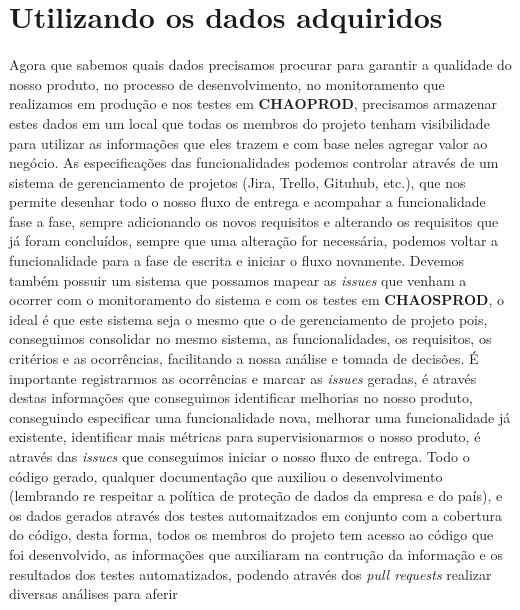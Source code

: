       \section{Utilizando os dados adquiridos}
        Agora que sabemos quais dados precisamos procurar para garantir a qualidade
        do nosso produto, no processo de desenvolvimento, no monitoramento que
        realizamos em produção e nos testes em \textbf{CHAOPROD}, precisamos
        armazenar estes dados em um local que todas os membros do projeto tenham
        visibilidade para utilizar as informações que eles trazem e com base neles
        agregar valor ao negócio. As especificações das funcionalidades podemos
        controlar através de um sistema de gerenciamento de projetos (Jira, Trello,
        Gituhub, etc.), que nos permite desenhar todo o nosso fluxo de entrega e
        acompahar a funcionalidade fase a fase, sempre adicionando os novos requisitos
        e alterando os requisitos que já foram concluídos, sempre que uma alteração
        for necessária, podemos voltar a funcionalidade para a fase de escrita e
        iniciar o fluxo novamente. Devemos também possuir um sistema que possamos
        mapear as \textit{issues} que venham a ocorrer com o monitoramento do sistema
        e com os testes em \textbf{CHAOSPROD}, o ideal é que este sistema seja o
        mesmo que o de gerenciamento de projeto pois, conseguimos consolidar no
        mesmo sistema, as funcionalidades, os requisitos, os critérios e as
        ocorrências, facilitando a nossa análise e tomada de decisões. É importante
        registrarmos as ocorrências e marcar as \textit{issues} geradas, é
        através destas informações que conseguimos identificar melhorias no nosso
        produto, conseguindo especificar uma funcionalidade nova, melhorar uma
        funcionalidade já existente, identificar mais métricas para supervisionarmos
        o nosso produto, é através das \textit{issues} que conseguimos iniciar o
        nosso fluxo de entrega. \newline
        Todo o código gerado, qualquer documentação que auxiliou o desenvolvimento
        (lembrando re respeitar a política de proteção de dados da empresa e do
        país), e os dados gerados através dos testes automaitzados em conjunto
        com a cobertura do código, desta forma, todos os membros do projeto tem
        acesso ao código que foi desenvolvido, as informações que auxiliaram na
        contrução da informação e os resultados dos testes automatizados, podendo
        através dos \textit{pull requests} realizar diversas análises para aferir
